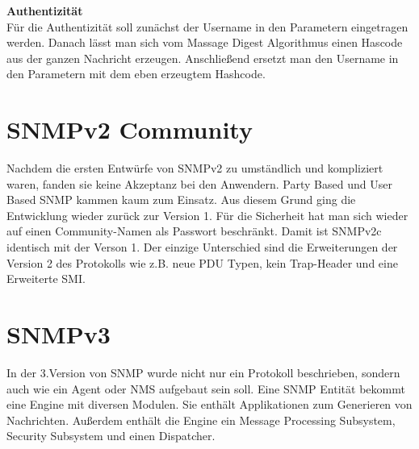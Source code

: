 \documentclass[11pt,a4paper]{article}
\begin{document}
\textbf{Authentizität}\\
Für die Authentizität soll zunächst der Username in den Parametern eingetragen werden. Danach lässt man sich vom Massage Digest Algorithmus einen Hascode aus der ganzen Nachricht erzeugen. Anschließend ersetzt man den Username in den Parametern mit dem eben erzeugtem Hashcode.\\

\section{SNMPv2 Community}
Nachdem die ersten Entwürfe von SNMPv2 zu umständlich und kompliziert waren, fanden sie keine Akzeptanz bei den Anwendern. Party Based und User Based SNMP kammen kaum zum Einsatz. Aus diesem Grund ging die Entwicklung wieder zurück zur Version 1. Für die Sicherheit hat man sich wieder auf einen Community-Namen als Passwort beschränkt. Damit ist SNMPv2c identisch mit der Verson 1. Der einzige Unterschied sind die Erweiterungen der Version 2 des Protokolls wie z.B. neue PDU Typen, kein Trap-Header und eine Erweiterte SMI.\\

\section{SNMPv3}
In der 3.Version von SNMP wurde nicht nur ein Protokoll beschrieben, sondern auch wie ein Agent oder NMS aufgebaut sein soll. Eine SNMP Entität bekommt eine Engine mit diversen Modulen. Sie enthält Applikationen zum Generieren von Nachrichten. Außerdem enthält die Engine ein Message Processing Subsystem, Security Subsystem und einen Dispatcher.
\end{document}
